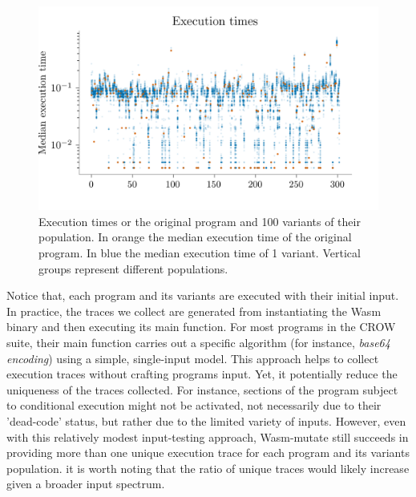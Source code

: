 \documentclass[sigplan,screen]{acmart}
\newcommand{\tool}{Wasm-mutate\xspace}
\newcommand{\wasm}{Wasm\xspace}
\begin{document}
\begin{figure}
    \centering
    \includegraphics[width=\linewidth]{plots/rq2/times.png}
    \caption{Execution times or the original program and 100 variants of their population. In orange the median execution time of the original program. In blue the median execution time of 1 variant. Vertical groups represent different populations.}
  \label{rq2:plot:execution_times}
\end{figure}



Notice that, each program and its variants are executed with their initial input.
In practice, the traces we collect are generated from instantiating the \wasm binary and then executing its main function. 
For most programs in the CROW suite, their main function carries out a specific algorithm (for instance, \emph{base64 encoding}) using a simple, single-input model. 
This approach helps to collect execution traces without crafting programs input.
Yet, it potentially reduce the uniqueness of the traces collected. 
For instance, sections of the program subject to conditional execution might not be activated, not necessarily due to their 'dead-code' status, but rather due to the limited variety of inputs. 
However, even with this relatively modest input-testing approach, \tool still succeeds in providing more than one unique execution trace for each program and its variants population.
it is worth noting that the ratio of unique traces would likely increase given a broader input spectrum.
\end{document}
